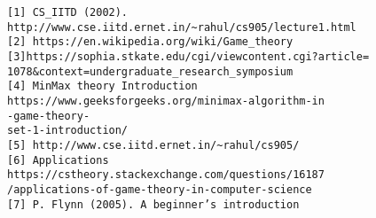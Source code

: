 \begin{verbatim}
[1] CS_IITD (2002).
http://www.cse.iitd.ernet.in/~rahul/cs905/lecture1.html
[2] https://en.wikipedia.org/wiki/Game_theory
[3]https://sophia.stkate.edu/cgi/viewcontent.cgi?article=
1078&context=undergraduate_research_symposium
[4] MinMax theory Introduction
https://www.geeksforgeeks.org/minimax-algorithm-in
-game-theory-
set-1-introduction/
[5] http://www.cse.iitd.ernet.in/~rahul/cs905/
[6] Applications
https://cstheory.stackexchange.com/questions/16187
/applications-of-game-theory-in-computer-science
[7] P. Flynn (2005). A beginner’s introduction 
\end{verbatim}